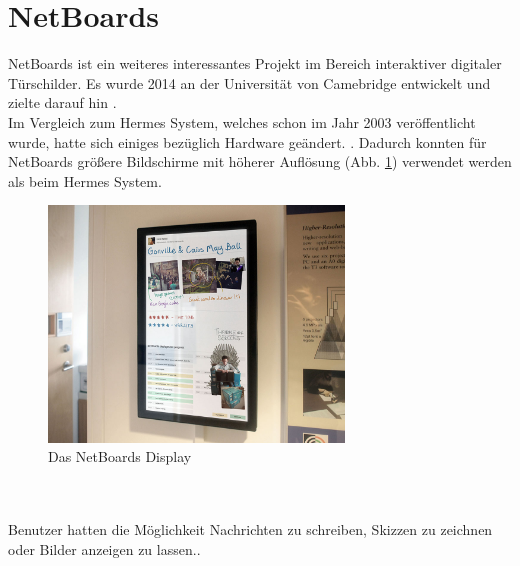 \section{NetBoards}
NetBoards\cite{wood:2014}\cite{netboards:website} ist ein weiteres interessantes Projekt im Bereich interaktiver digitaler Türschilder. Es wurde 2014 an der Universität von Camebridge entwickelt und zielte darauf hin \cite{wood:2014}.\\
Im Vergleich zum Hermes System, welches schon im Jahr 2003 veröffentlicht wurde, hatte sich einiges bezüglich Hardware geändert. \cite{wood:2014}.
Dadurch konnten für NetBoards größere Bildschirme mit höherer Auflösung (Abb. \ref{img:netBoardsDisplay}) verwendet werden als beim Hermes System.
\begin{figure}[h!]
  \centering
    \includegraphics[width=0.7\textwidth]{./img/netBoards_display.png}
  \caption{Das NetBoards Display\cite{wood:2014}}
  \label{img:netBoardsDisplay}
\end{figure}
\\
\\
Benutzer hatten die Möglichkeit Nachrichten zu schreiben, Skizzen zu zeichnen oder Bilder anzeigen zu lassen.\cite{wood:2014}.



